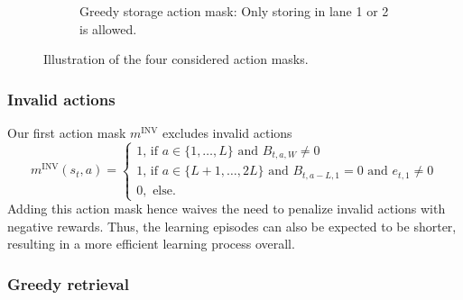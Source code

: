 \documentclass[11pt]{elsarticle}
\begin{document}
\begin{figure}[H]
\begin{subfigure}[b]{0.45\textwidth}
\vspace{0.2cm}
     	\caption{Greedy storage action mask: Only storing in lane 1 or 2 is allowed.}
     \end{subfigure}  
        \caption{Illustration of the four considered action masks.}
        \label{fig:Action_mask_illustration}
\end{figure}

\subsubsection*{Invalid actions}

Our first action mask $m^{\text{INV}}$ excludes invalid actions 
\begin{equation}
m^{\text{INV}}(s_t,a)=\begin{cases}
1\text{, if } a\in\{1,\dots,L\} \text{ and } B_{t,a,W}\neq 0 \\ 
1\text{, if } a\in\{L+1,\dots,2L\} \text{ and }  B_{t,a-L,1}=0 \text{ and } e_{t,1}\neq 0 \\
0, \text{ else}.
\end{cases}
\end{equation} 
Adding this action mask hence waives the need to penalize invalid actions with negative rewards. Thus, the learning episodes can also be expected to be shorter, resulting in a more efficient learning process overall.


\subsubsection*{Greedy retrieval}
\end{document}

